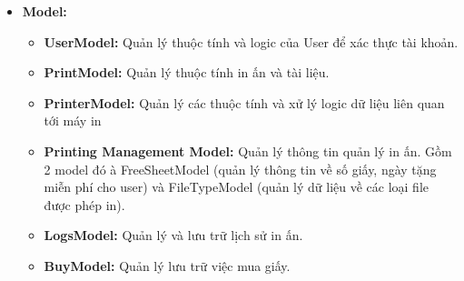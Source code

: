 \begin{itemize}
    \item \textbf{Model:}
    \begin{itemize}
        \item \textbf{UserModel:} Quản lý thuộc tính và logic của User để xác thực tài khoản.
        \item \textbf{PrintModel:} Quản lý thuộc tính in ấn và tài liệu.
        \item \textbf{PrinterModel:} Quản lý các thuộc tính và xử lý logic dữ liệu liên quan tới máy in
        \item \textbf{Printing Management Model:} Quản lý thông tin quản lý in ấn. Gồm 2 model đó à FreeSheetModel (quản lý thông tin về số giấy, ngày tặng miễn phí cho user) và FileTypeModel (quản lý dữ liệu về các loại file được phép in).
        \item \textbf{LogsModel:} Quản lý và lưu trữ lịch sử in ấn.
        \item \textbf{BuyModel: }Quản lý lưu trữ việc mua giấy.
        

\end{itemize}
\end{itemize}
